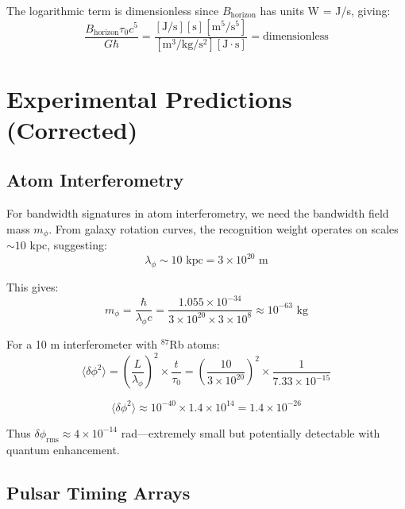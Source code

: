 \documentclass[twocolumn,prd,amsmath,amssymb,aps,superscriptaddress,nofootinbib]{revtex4-2}
\begin{document}
The logarithmic term is dimensionless since $B_{\text{horizon}}$ has units W = J/s, giving:
\begin{equation}
\frac{B_{\text{horizon}} \tau_0 c^5}{G\hbar} = \frac{[\text{J/s}][\text{s}][\text{m}^5/\text{s}^5]}{[\text{m}^3/\text{kg}/\text{s}^2][\text{J}\cdot\text{s}]} = \text{dimensionless}
\end{equation}

\section{Experimental Predictions (Corrected)}
\label{sec:experiments}

\subsection{Atom Interferometry}

For bandwidth signatures in atom interferometry, we need the bandwidth field mass $m_\phi$. From galaxy rotation curves, the recognition weight operates on scales $\sim 10$ kpc, suggesting:
\begin{equation}
\lambda_\phi \sim 10 \text{ kpc} = 3 \times 10^{20} \text{ m}
\end{equation}

This gives:
\begin{equation}
m_\phi = \frac{\hbar}{\lambda_\phi c} = \frac{1.055 \times 10^{-34}}{3 \times 10^{20} \times 3 \times 10^8} \approx 10^{-63} \text{ kg}
\end{equation}

For a 10 m interferometer with $^{87}$Rb atoms:
\begin{equation}
\langle\delta\phi^2\rangle = \left(\frac{L}{\lambda_\phi}\right)^2 \times \frac{t}{\tau_0} = \left(\frac{10}{3 \times 10^{20}}\right)^2 \times \frac{1}{7.33 \times 10^{-15}}
\end{equation}

\begin{equation}
\langle\delta\phi^2\rangle \approx 10^{-40} \times 1.4 \times 10^{14} = 1.4 \times 10^{-26}
\end{equation}

Thus $\delta\phi_{\text{rms}} \approx 4 \times 10^{-14}$ rad---extremely small but potentially detectable with quantum enhancement.

\subsection{Pulsar Timing Arrays}
\end{document}
